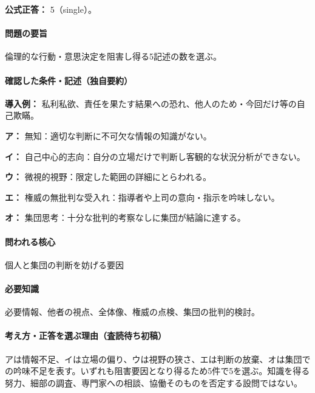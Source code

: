 \textbf{公式正答：} 5（single）。

\paragraph{問題の要旨} 倫理的な行動・意思決定を阻害し得る5記述の数を選ぶ。

\paragraph{確認した条件・記述（独自要約）}\mbox{}\par

\noindent\textbf{導入例：} 私利私欲、責任を果たす結果への恐れ、他人のため・今回だけ等の自己欺瞞。\par

\noindent\textbf{ア：} 無知：適切な判断に不可欠な情報の知識がない。\par

\noindent\textbf{イ：} 自己中心的志向：自分の立場だけで判断し客観的な状況分析ができない。\par

\noindent\textbf{ウ：} 微視的視野：限定した範囲の詳細にとらわれる。\par

\noindent\textbf{エ：} 権威の無批判な受入れ：指導者や上司の意向・指示を吟味しない。\par

\noindent\textbf{オ：} 集団思考：十分な批判的考察なしに集団が結論に達する。\par

\paragraph{問われる核心} 個人と集団の判断を妨げる要因

\paragraph{必要知識} 必要情報、他者の視点、全体像、権威の点検、集団の批判的検討。

\paragraph{考え方・正答を選ぶ理由（査読待ち初稿）} アは情報不足、イは立場の偏り、ウは視野の狭さ、エは判断の放棄、オは集団での吟味不足を表す。いずれも阻害要因となり得るため5件で5を選ぶ。知識を得る努力、細部の調査、専門家への相談、協働そのものを否定する設問ではない。

